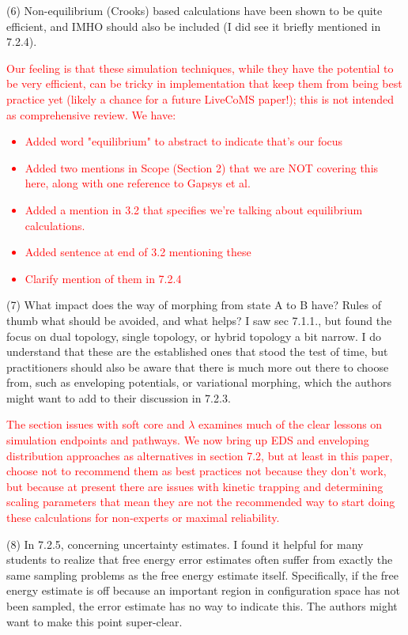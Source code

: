 \documentclass[11pt,a4paper]{letter} %
\begin{document}
\begin{letter}
(6) Non-equilibrium (Crooks) based calculations have been shown to be quite efficient, and IMHO should also be included (I did see it briefly mentioned in 7.2.4).

\textcolor{red}{
Our feeling is that these simulation techniques, while they have the potential to be very efficient, can be tricky in implementation that keep them from being best practice yet (likely a chance for a future LiveCoMS paper!); this is not intended as comprehensive review.  We have: 
\begin{itemize}
\item Added word "equilibrium" to abstract to indicate that's our focus
\item Added two mentions in Scope (Section 2) that we are NOT covering this here, along with one reference to Gapsys et al.
\item Added a mention in 3.2 that specifies we're talking about equilibrium calculations.
\item Added sentence at end of 3.2 mentioning these
\item Clarify mention of them in 7.2.4 
\end{itemize}
}

(7) What impact does the way of morphing from state A to B have? Rules of thumb what should be avoided, and what helps? I saw sec 7.1.1., but found the focus on dual topology, single topology, or hybrid topology a bit narrow. I do understand that these are the established ones that stood the test of time, but practitioners should also be aware that there is much more out there to choose from, such as enveloping potentials, or variational morphing, which the authors might want to add to their discussion in 7.2.3.

\textcolor{red}{The section issues with soft core and $\lambda$ examines much of the clear lessons on simulation endpoints and pathways. We now bring up EDS and enveloping distribution approaches as alternatives in section 7.2, but at least in this paper, choose not to recommend them as best practices not because they don't work, but because at present there are issues with kinetic trapping and determining scaling parameters that mean they are not the recommended way to start doing these calculations for non-experts or maximal reliability.} 

(8) In 7.2.5, concerning uncertainty estimates. I found it helpful for many students to realize that free energy error estimates often suffer from exactly the same sampling problems as the free energy estimate itself. Specifically, if the free energy estimate is off because an important region in configuration space has not been sampled, the error estimate has no way to indicate this. The authors might want to make this point super-clear.


\end{letter}
\end{document}
